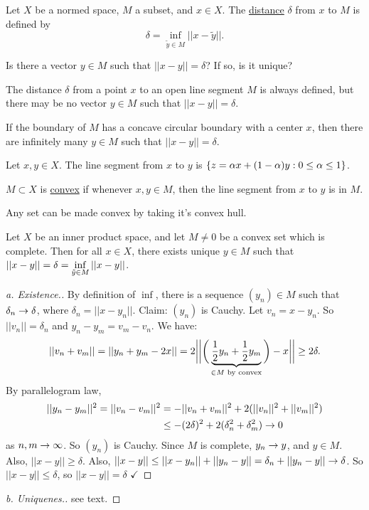 \documentclass[]{article}
\begin{document}
Let $X$ be a normed space, $M$ a subset, and $x\in X$.
The \ul{distance} $\delta$ from $x$ to $M$ is defined by $$\delta = \inf_{\tilde y\in M} ||x-\tilde y||.$$

\begin{question}
	Is there a vector $y\in M$ such that $||x-y||=\delta$? If so, is it unique?
\end{question}
\begin{example}
	[In $\mb R^2$] The distance $\delta$ from a point $x$ to an open line segment $M$ is always defined, but there may be no vector $y\in M$ such that $||x-y||=\delta$.
\end{example}
\begin{example}
	If the boundary of $M$ has a concave circular boundary with a center $x$, then there are infinitely many $y\in M$ such that $||x-y||=\delta$.
\end{example}
\begin{definition}
	Let $x,y\in X$. The line segment from $x$ to $y$ is $\setc{z = \alpha x+(1-\alpha)y}{0\leq\alpha\leq 1}$.
\end{definition}
\begin{definition}
	$M\subset X$ is \ul{convex} if whenever $x,y\in M$, then the line segment from $x$ to $y$ is in $M$.
\end{definition}
\begin{remark}
	Any set can be made convex by taking it's convex hull.
\end{remark}

\begin{theorem}
	Let $X$ be an inner product space, and let $M\neq0$ be a convex set which is complete.
	Then for all $x\in X$, there exists unique $y\in M$ such that $\ds||x-y||=\delta = \inf_{\tilde y\in M}||x-y||$.
\end{theorem}
\begin{proof}
	[a. Existence.] By definition of $\inf$, there is a sequence $(y_n)\in M$ such that $\delta_n\ra\delta$, where $\delta_n=||x-y_n||$.
	Claim: $(y_n)$ is Cauchy. Let $v_n=x-y_n$. So $||v_n||=\delta_n$ and $y_n-y_m = v_m-v_n$.
	We have: $$||v_n+v_m|| = ||y_n+y_m-2x|| = 2\bigg|\bigg|\bigg(\ub{\in M\text{ by convex}}{\frac12y_n+\frac12y_m}\bigg)-x\bigg|\bigg| \geq2\delta.$$
	By parallelogram law,
	\begin{align*}
		||y_n-y_m||^2 = ||v_n-v_m||^2 &= -||v_n+v_m||^2 + 2(||v_n||^2+||v_m||^2) \\
									  &\leq -(2\delta)^2 + 2(\delta_n^2+\delta_m^2) \ra0
	\end{align*}
	as $n,m\ra\infty$. So $(y_n)$ is Cauchy.
	Since $M$ is complete, $y_n\ra y$, and $y\in M$. Also, $||x-y|| \geq \delta$.
	Also, $||x-y||\leq ||x-y_n||+||y_n-y|| = \delta_n + ||y_n-y||\ra\delta$.
	So $||x-y||\leq\delta$, so $||x-y||=\delta$ $\checkmark$
\end{proof}
\begin{proof}
	[b. Uniquenes.] see text.
\end{proof}
\end{document}

